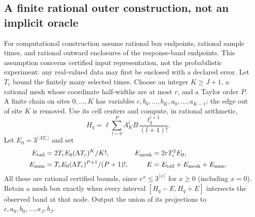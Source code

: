 \subsection{A finite rational outer construction, not an implicit oracle}
\label{subsec:algorithm}
For computational construction assume rational box endpoints, rational sample
times, and rational outward enclosures of the response-band endpoints. This
assumption concerns certified input representation, not the probabilistic
experiment: any real-valued data may first be enclosed with a declared error.
Let $T_c$ bound the finitely many selected times. Choose an integer $K\ge J+1$,
a rational mesh whose coordinate half-widths are at most $r$, and a Taylor
order $P$. A finite chain on sites $0,\ldots,K$ has variables
$c,b_0,\ldots,b_K,a_0,\ldots,a_{K-1}$; the edge out of site $K$ is removed.
Use its cell centers and compute, in rational arithmetic,
\[
 H_q=\ell\sum_{l=0}^{P}A_K^l B\,\frac{t_q^{l+1}}{(l+1)!}.
\]
Let $E_0=3^{\lceil\Lambda T_c\rceil}$ and set
\begin{equation}
 \begin{aligned}
 E_{\rm tail}&=2T_cE_0(\Lambda T_c)^K/K!,&
 E_{\rm mesh}&=2rT_c^2E_0,\\
 E_{\rm num}&=T_cE_0(\Lambda T_c)^{P+1}/(P+1)!,&
 E&=E_{\rm tail}+E_{\rm mesh}+E_{\rm num}.
 \end{aligned}
 \label{eq:outer-errors}
\end{equation}
All these are rational certified bounds, since $e^x\le3^{\lceil x\rceil}$
for $x\ge0$ (including $x=0$). Retain a mesh box exactly when every interval
$[H_q-E,H_q+E]$ intersects the observed band at that node. Output the union of
its projections to $c,a_0,b_0,\ldots,a_J,b_J$.

